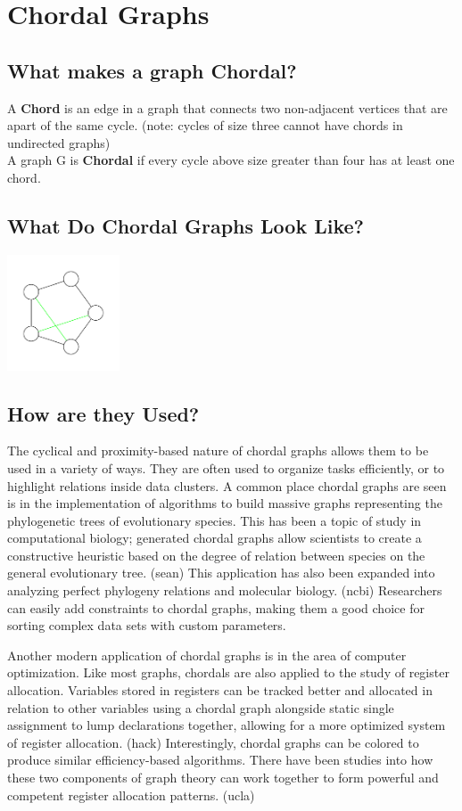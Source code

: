 \chapter{Chordal Graphs}
\section{What makes a graph Chordal?}
A \textbf{Chord} is an edge in a graph that connects two non-adjacent vertices that are apart of the same cycle. (note: cycles of size three cannot have chords in undirected graphs)\\
A graph G is \textbf{Chordal} if every cycle above size greater than four has at least one chord.\\

\section{What Do Chordal Graphs Look Like?}
\includegraphics[width=0.25\textwidth]{./ChapterChordal/chordalGraph.pdf}

\section{How are they Used?}
The cyclical and proximity-based nature of chordal graphs allows them to be used in a variety of ways. They are often used to organize
tasks efficiently, or to highlight relations inside data clusters. A common place chordal graphs are seen is in the implementation of algorithms to build
massive graphs representing the phylogenetic trees of evolutionary species. This has been a topic of study in computational biology; generated chordal
graphs allow scientists to create a constructive heuristic based on the degree of relation between species on the general evolutionary tree. (sean) This
application has also been expanded into analyzing perfect phylogeny relations and molecular biology. (ncbi) Researchers can easily add constraints to
chordal graphs, making them a good choice for sorting complex data sets with custom parameters.\par
Another modern application of chordal graphs is in the area of computer optimization. Like most graphs, chordals are also applied to the study of
register allocation. Variables stored in registers can be tracked better and allocated in relation to other variables using a chordal graph alongside
static single assignment to lump declarations together, allowing for a more optimized system of register allocation. (hack) Interestingly, chordal graphs
can be colored to produce similar efficiency-based algorithms. There have been studies into how these two components of graph theory can work together to
form powerful and competent register allocation patterns. (ucla)\\


